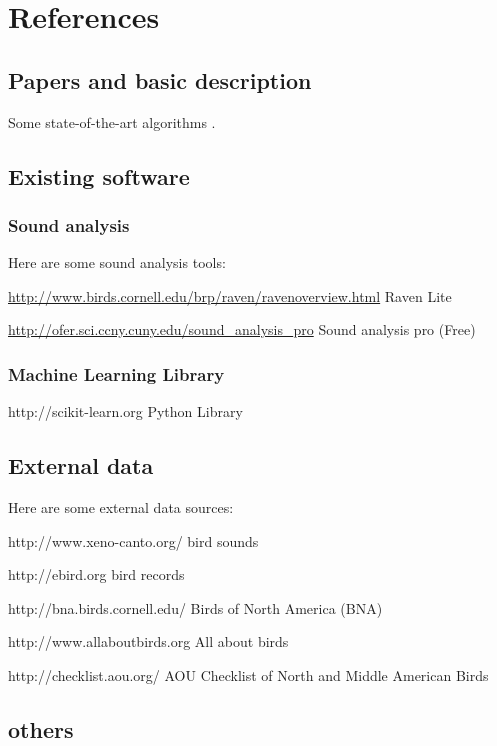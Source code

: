 \section{References}

\subsection{Papers and basic description}

Some state-of-the-art algorithms \cite{briggs2013instance,Lasseck13,Massaron13,stattnersong13}.

\subsection{Existing software}

\subsubsection{Sound analysis}

Here are some sound analysis tools:

\url{http://www.birds.cornell.edu/brp/raven/ravenoverview.html} Raven Lite

\url{http://ofer.sci.ccny.cuny.edu/sound_analysis_pro}  Sound analysis pro (Free)



\subsubsection{Machine Learning Library}

http://scikit-learn.org Python Library

\subsection{External data}

Here are some external data sources:

http://www.xeno-canto.org/ bird sounds

http://ebird.org  bird records

http://bna.birds.cornell.edu/ Birds of North America (BNA) 

http://www.allaboutbirds.org All about birds

http://checklist.aou.org/        AOU Checklist of North and Middle American Birds


\subsection{others}


